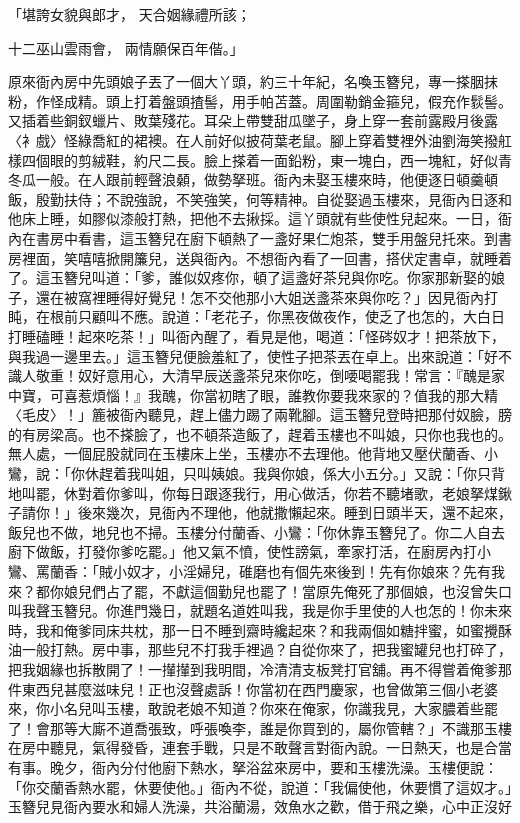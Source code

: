 \begin{showcontents}{}
「堪誇女貌與郎才，  天合姻緣禮所該；

十二巫山雲雨會，  兩情願保百年偕。」

原來衙內房中先頭娘子丟了一個大丫頭，約三十年紀，名喚玉簪兒，專一搽胭抹粉，作怪成精。頭上打着盤頭揸髻，用手帕苫蓋。周圍勒銷金箍兒，假充作䯼髻。又插着些銅釵蠟片、敗葉殘花。耳朵上帶雙甜瓜墜子，身上穿一套前露殿月後露〈衤戲〉怪綠喬紅的裙襖。在人前好似披荷葉老鼠。腳上穿着雙裡外油劉海笑撥舡樣四個眼的剪絨鞋，約尺二長。臉上搽着一面鉛粉，東一塊白，西一塊紅，好似青冬瓜一般。在人跟前輕聲浪顙，做勢拏班。衙內未娶玉樓來時，他便逐日頓羹頓飯，殷勤扶侍；不說強說，不笑強笑，何等精神。自從娶過玉樓來，見衙內日逐和他床上睡，如膠似漆般打熱，把他不去揪採。這丫頭就有些使性兒起來。一日，衙內在書房中看書，這玉簪兒在廚下頓熱了一盞好果仁炮茶，雙手用盤兒托來。到書房裡面，笑嘻嘻掀開簾兒，送與衙內。不想衙內看了一回書，搭伏定書卓，就睡着了。這玉簪兒叫道：「爹，誰似奴疼你，頓了這盞好茶兒與你吃。你家那新娶的娘子，還在被窩裡睡得好覺兒！怎不交他那小大姐送盞茶來與你吃？」因見衙內打盹，在根前只顧叫不應。說道：「老花子，你黑夜做夜作，使乏了也怎的，大白日打睡磕睡！起來吃茶！」叫衙內醒了，看見是他，喝道：「怪硶奴才！把茶放下，與我過一邊里去。」這玉簪兒便臉羞紅了，使性子把茶丟在卓上。出來說道：「好不識人敬重！奴好意用心，大清早辰送盞茶兒來你吃，倒喓喝罷我！常言：『醜是家中寶，可喜惹煩惱！』我醜，你當初瞎了眼，誰教你要我來家的？值我的那大精〈毛皮〉！」簏被衙內聽見，趕上儘力踢了兩靴腳。這玉簪兒登時把那付奴臉，膀的有房梁高。也不搽臉了，也不頓茶造飯了，趕着玉樓也不叫娘，只你也我也的。無人處，一個屁股就同在玉樓床上坐，玉樓亦不去理他。他背地又壓伏蘭香、小鸞，說：「你休趕着我叫姐，只叫姨娘。我與你娘，係大小五分。」又說：「你只背地叫罷，休對着你爹叫，你每日跟逐我行，用心做活，你若不聽堵歌，老娘拏煤鍬子請你！」後來幾次，見衙內不理他，他就撒懶起來。睡到日頭半天，還不起來，飯兒也不做，地兒也不掃。玉樓分付蘭香、小鸞：「你休靠玉簪兒了。你二人自去廚下做飯，打發你爹吃罷。」他又氣不憤，使性謗氣，牽家打活，在廚房內打小鸞、罵蘭香：「賊小奴才，小淫婦兒，碓磨也有個先來後到！先有你娘來？先有我來？都你娘兒們占了罷，不獻這個勤兒也罷了！當原先俺死了那個娘，也沒曾失口叫我聲玉簪兒。你進門幾日，就題名道姓叫我，我是你手里使的人也怎的！你未來時，我和俺爹同床共枕，那一日不睡到齋時纔起來？和我兩個如糖拌蜜，如蜜攪酥油一般打熱。房中事，那些兒不打我手裡過？自從你來了，把我蜜罐兒也打碎了，把我姻緣也拆散開了！一攆攆到我明間，冷清清支板凳打官舖。再不得嘗着俺爹那件東西兒甚麼滋味兒！正也沒聲處訴！你當初在西門慶家，也曾做第三個小老婆來，你小名兒叫玉樓，敢說老娘不知道？你來在俺家，你識我見，大家膿着些罷了！會那等大廝不道喬張致，呼張喚李，誰是你買到的，屬你管轄？」不識那玉樓在房中聽見，氣得發昏，連套手戰，只是不敢聲言對衙內說。一日熱天，也是合當有事。晚夕，衙內分付他廚下熱水，拏浴盆來房中，要和玉樓洗澡。玉樓便說：「你交蘭香熱水罷，休要使他。」衙內不從，說道：「我偏使他，休要慣了這奴才。」玉簪兒見衙內要水和婦人洗澡，共浴蘭湯，效魚水之歡，借于飛之樂，心中正沒好
\end{showcontents}
